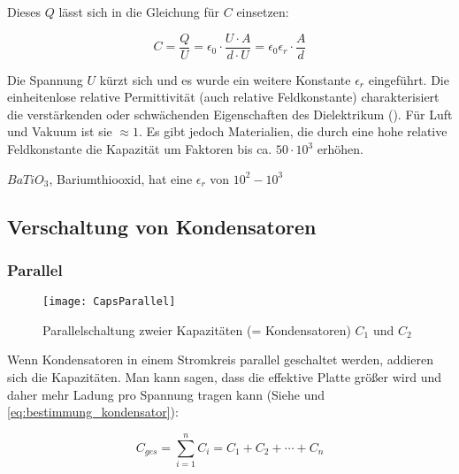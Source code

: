 \noindent Dieses $Q$ lässt sich in die Gleichung für $C$ einsetzen:

\begin{equation} \label{eq:bestimmung_kondensator}
	C = \frac{Q}{U} = \epsilon_0 \cdot \frac{U \cdot A}{d \cdot U} = \epsilon_0 \epsilon_r \cdot \frac{A}{d}
\end{equation}

Die Spannung $U$ kürzt sich und es wurde ein weitere Konstante $\epsilon_r$ eingeführt. Die einheitenlose \glqq relative Permittivität\grqq{}  (auch \glqq relative Feldkonstante\grqq) charakterisiert die verstärkenden oder schwächenden Eigenschaften des Dielektrikum (). Für Luft und Vakuum ist sie $\approx 1$. Es gibt jedoch Materialien, die durch eine hohe relative Feldkonstante die Kapazität um Faktoren bis ca. $50 \cdot 10^3$ erhöhen.

\begin{NiceToKnow}
$BaTiO_3$, Bariumthiooxid, hat eine $\epsilon_r$ von $10^2-10^3$
\end{NiceToKnow}


\subsection{Verschaltung von Kondensatoren}

\subsubsection{Parallel}

\begin{figure}[h!]
	\centering
	\texttt{[image: CapsParallel]}
	\caption{Parallelschaltung zweier Kapazitäten (= Kondensatoren) $C_1$ und $C_2$}
\end{figure}

Wenn Kondensatoren in einem Stromkreis parallel geschaltet werden, addieren sich die Kapazitäten. Man kann sagen, dass die effektive Platte größer wird und daher mehr Ladung pro Spannung tragen kann (Siehe  und \ref{eq:bestimmung_kondensator}):

\begin{equation}
	C_{ges} = \sum\limits_{i=1}^n C_i = C_1 + C_2 + \cdots + C_n
\end{equation}

